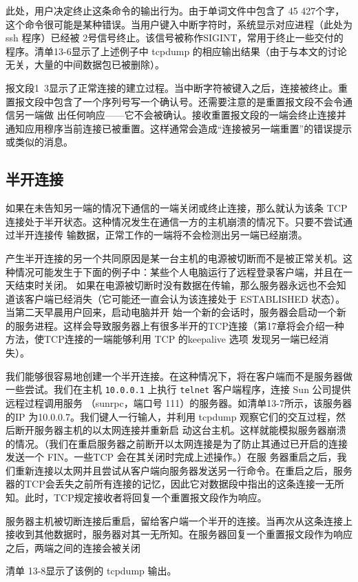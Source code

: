 此处，用户决定终止这条命令的输出行为。由于单词文件中包含了 45 427个字，这个命令很可能是某种错误。当用户键入中断字符时，系统显示对应进程（此处为 ssh 程序）已经被
2号信号终止。该信号被称作SIGINT，常用于终止一些交付的程序。清单13-6显示了上述例子中 tcpdump 的相应输出结果（由于与本文的讨论无关，大量的中间数据包已被删除）。

报文段1~3显示了正常连接的建立过程。当中断字符被键入之后，连接被终止。重置报文段中包含了一个序列号写一个确认号。还需要注意的是重置报文段不会令通信另一端做
出任何响应——它不会被确认。接收重置报文段的一端会终止连接并通知应用穆序当前连接已被重置。这样通常会造成“连接被另一端重置”的错误提示或类似的消息。
\subsection{半开连接}
如果在未告知另一端的情况下通信的一端关闭或终止连接，那么就认为该条 TCP 连接处于半开状态。这种情况发生在通信一方的主机崩溃的情况下。只要不尝试通过半开连接传
输数据，正常工作的一端将不会检测出另一端已经崩溃。

产生半开连接的另一个共同原因是某一台主机的电源被切断而不是被正常关机。这种情况可能发生于下面的例子中：某些个人电脑运行了远程登录客户端，并且在一天结束时关闭。
如果在电源被切断时没有数据在传输，那么服务器永远也不会知道该客户端已经消失（它可能还一直会认为该连接处于 ESTABLISHED 状态）。当第二天早晨用户回来，启动电脑并开
始一个新的会话时，服务器会启动一个新的服务进程。这样会导致服务器上有很多半开的TCP连接（第17章将会介绍一种方法，使TCP连接的一端能够利用 TCP 的keepalive 选项
发现另一端已经消失）。

我们能够很容易地创建一个半开连接。在这种情况下，将在客户端而不是服务器做一些尝试。我们在主机 \verb|10.0.0.1| 上执行 \verb|telnet| 客户端程序，连接 Sun 公司提供远程过程调用服务
（sunrpc，端口号 111）的服务器。如清单13-7所示，该服务器的IP 为10.0.0.7。我们键人一行输人，并利用 tcpdump 观察它们的交互过程，然后断开服务器主机的以太网连接并重新启
动这台主机。这样就能模拟服务器崩溃的情况。（我们在重启服务器之前断开以太网连接是为了防止其通过已开启的连接发送一个 FIN。一些TCP 会在其关闭时完成上述操作。）在服
务器重启之后，我们重新连接以太网并且尝试从客户端向服务器发送另一行命令。在重启之后，服务器的TCP会丢失之前所有连接的记忆，因此它对数据段中指出的这条连接一无所
知。此时，TCP规定接收者将回复一个重置报文段作为响应。

服务器主机被切断连接后重启，留给客户端一个半开的连接。当再次从这条连接上接收到其他数据时，服务器对其一无所知。在服务器回复一个重置报文段作为响应之后，两端之间的连接会被关闭

清单 13-8显示了该例的 tcpdump 输出。

